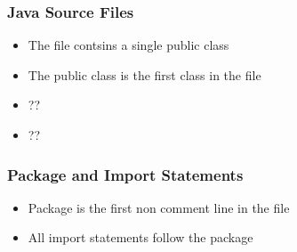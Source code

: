 \subsubsection{Java Source Files}
\begin{itemize}
\item The file contsins  a single public class\\
\item The public class is the first class in the file\\
\item ??
\item ??
\end{itemize}

\subsubsection{Package and Import Statements}
\begin{itemize}
\item Package is the first non comment line in the file\\
\item All import statements follow the package\\ 
\end{itemize}

